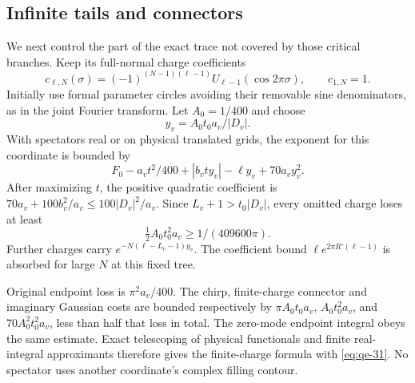 \subsection{Infinite tails and connectors}\label{sec:qe-8}

We next control the part of the exact trace not covered by those
critical branches. Keep its full-normal charge coefficients
\begin{equation}
c_{\ell,N}(\sigma)=
 (-1)^{(N-1)(\ell-1)}U_{\ell-1}(\cos2\pi\sigma),\qquad c_{1,N}=1.
\label{eq:qe-28}
\end{equation}
Initially use formal parameter circles avoiding their removable sine denominators, as in the joint Fourier transform. Let \(A_0=1/400\) and choose
\begin{equation}
y_v=A_0t_0a_v/|D_v|.
\label{eq:qe-29}
\end{equation}
With spectators real or on physical translated grids, the exponent for this coordinate is bounded by
\begin{equation}
F_0-a_vt^2/400+|b_vty_v|-\ell y_v+70a_vy_v^2.
\label{eq:qe-30}
\end{equation}
After maximizing \(t\), the positive quadratic coefficient is \(70a_v+100b_v^2/a_v\le100|D_v|^2/a_v\). Since \(L_v+1>t_0|D_v|\), every omitted charge loses at least
\begin{equation}
\tfrac12A_0t_0^2a_v
                              \ge1/(409600\pi).
\label{eq:qe-31}
\end{equation}
Further charges carry \(e^{-N(\ell-L_v-1)y_v}\). The coefficient bound \(\ell e^{2\pi R'(\ell-1)}\) is absorbed for large \(N\) at this fixed tree.

Original endpoint loss is \(\pi^2a_v/400\). The chirp, finite-charge connector and imaginary Gaussian costs are bounded respectively by \(\pi A_0t_0a_v\), \(A_0t_0^2a_v\), and \(70A_0^2t_0^2a_v\), less than half that loss in total. The zero-mode endpoint integral obeys the same estimate. Exact telescoping of physical functionals and finite real-integral approximants therefore gives the finite-charge formula with \eqref{eq:qe-31}. No spectator uses another coordinate's complex filling contour.

